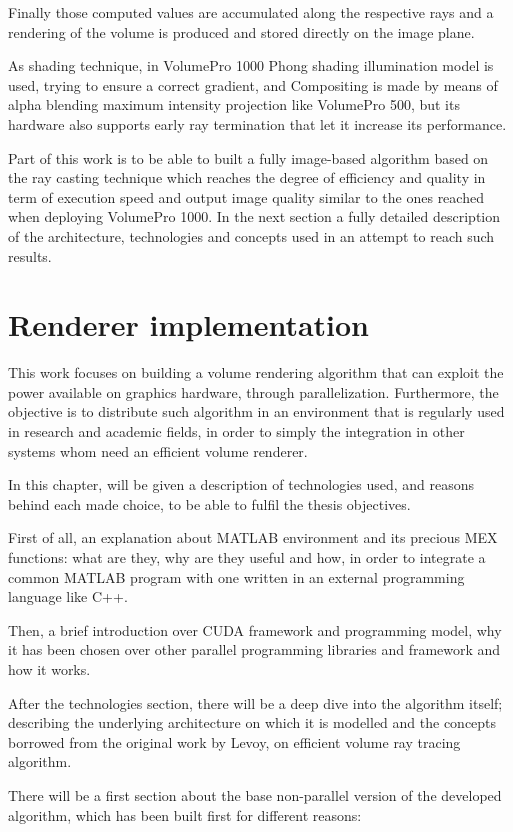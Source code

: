 \documentclass[12pt,a4paper]{extarticle}
\newcommand{\linespace}{\vspace{8pt}}
\begin{document}
Finally those computed values are accumulated along the respective rays and a rendering of the volume is produced and stored directly on the image plane.
\linespace

As shading technique, in VolumePro 1000  Phong shading illumination model is used, trying to ensure a correct gradient, and Compositing is made by means of alpha blending maximum intensity projection like  VolumePro 500, but its hardware also supports early ray termination that let it increase  its performance.

\linespace
Part of this work is to be able to built a fully image-based algorithm based on the ray casting technique which reaches the degree of efficiency and quality in term of execution speed and output image quality similar to the ones reached when deploying VolumePro 1000. In the next section a fully detailed description of the architecture, technologies and concepts used in an attempt to reach such results.
\pagebreak
\section{Renderer implementation} 
This work focuses on building a volume rendering algorithm that can exploit the power available on graphics hardware, through parallelization. Furthermore, the objective is to distribute such algorithm in an environment that is regularly used in research and academic fields, in order to simply the integration in other systems whom need an efficient volume renderer.


In this chapter, will be given a description of technologies used, and reasons behind each made choice, to be able to fulfil the thesis objectives.
\linespace

First of all, an explanation about MATLAB environment and its precious MEX functions: what are they, why are they useful and how, in order to integrate a common MATLAB program with one written in an external programming language like C++.

Then, a brief introduction over CUDA framework and programming model, why it has been chosen over other parallel programming libraries and framework and how it works.

After the technologies section, there will be a deep dive into the algorithm itself; describing the underlying architecture on which it is modelled and the concepts borrowed from the original work by Levoy, on efficient volume ray tracing algorithm.
\linespace

There will be a first section about the base non-parallel version of the developed algorithm, which has been built first for different reasons:
\end{document}
